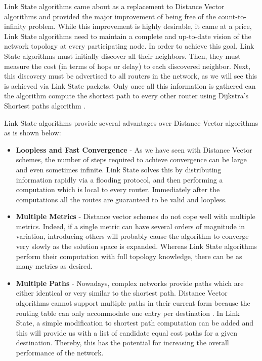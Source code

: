 
Link State algorithms came about as a replacement to Distance Vector algorithms and provided the major improvement of being free of the count-to-infinity problem. While this improvement is highly desirable, it came at a price, Link State algorithms need to maintain a complete and up-to-date vision of the network topology at every participating node. In order to achieve this goal, Link State algorithms must initially discover all their neighbors. Then, they must measure the cost (in terms of hops or delay) to each discovered neighbor. Next, this discovery must be advertised to all routers in the network, as we will see this is achieved via Link State packets. Only once all this information is gathered can the algorithm compute the shortest path to every other router using Dijkstra's Shortest paths algorithm \cite{DIJK}.

Link State algorithms provide several advantages over Distance Vector algorithms as is shown below:

\begin{itemize}
 \item \textbf{Loopless and Fast Convergence} - As we have seen with Distance Vector schemes, the number of steps required to achieve convergence can be large and even sometimes infinite. Link State solves this by distributing information rapidly via a flooding protocol, and then performing a computation which is local to every router. Immediately after the computations all the routes are guaranteed to be valid and loopless.
 \item \textbf{Multiple Metrics} - Distance vector schemes do not cope well with multiple metrics. Indeed, if a single metric can have several orders of magnitude in variation, introducing others will probably cause the algorithm to converge very slowly as the solution space is expanded. Whereas Link State algorithms perform their computation with full topology knowledge, there can be as many metrics as desired.
 \item \textbf{Multiple Paths} - Nowadays, complex networks provide paths which are either identical or very similar to the shortest path. Distance Vector algorithms cannot support multiple paths in their current form because the routing table can only accommodate one entry per destination \cite{Huitema}. In Link State, a simple modification to shortest path computation can be added and this will provide us with a list of candidate equal cost paths for a given destination. Thereby, this has the potential for increasing the overall performance of the network.
\end{itemize}


